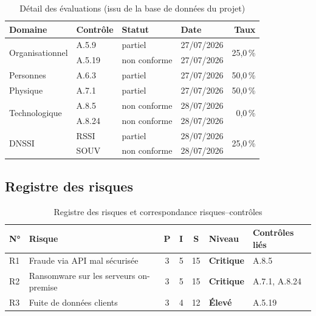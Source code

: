 \documentclass[11pt,a4paper]{article}
\newcommand{\lvl}[2]{\textcolor{#1}{\textbf{#2}}}
\begin{document}
\begin{table}[H]
\centering\small
\begin{tabular}{@{}llllr@{}}
\toprule
\textbf{Domaine} & \textbf{Contrôle} & \textbf{Statut} & \textbf{Date} & \textbf{Taux}\\
\midrule
\multirow{2}{*}{Organisationnel} & A.5.9 & partiel & 27/07/2026 & \multirow{2}{*}{25,0\,\%}\\
 & A.5.19 & non conforme & 27/07/2026 & \\
Personnes & A.6.3 & partiel & 27/07/2026 & 50,0\,\%\\
Physique & A.7.1 & partiel & 27/07/2026 & 50,0\,\%\\
\multirow{2}{*}{Technologique} & A.8.5 & non conforme & 28/07/2026 & \multirow{2}{*}{0,0\,\%}\\
 & A.8.24 & non conforme & 28/07/2026 & \\
\multirow{2}{*}{DNSSI} & RSSI & partiel & 28/07/2026 & \multirow{2}{*}{25,0\,\%}\\
 & SOUV & non conforme & 28/07/2026 & \\
\bottomrule
\end{tabular}
\caption{Détail des évaluations (issu de la base de données du projet)}
\end{table}

\subsection{Registre des risques}
\begin{table}[H]
\centering\small
\begin{tabularx}{\linewidth}{@{}lXcccll@{}}
\toprule
\textbf{N°} & \textbf{Risque} & \textbf{P} & \textbf{I} & \textbf{S} & \textbf{Niveau} & \textbf{Contrôles liés}\\
\midrule
R1 & Fraude via API mal sécurisée & 3 & 5 & 15 & \lvl{rcrit}{Critique} & A.8.5\\
R2 & Ransomware sur les serveurs on-premise & 3 & 5 & 15 & \lvl{rcrit}{Critique} & A.7.1, A.8.24\\
R3 & Fuite de données clients & 3 & 4 & 12 & \lvl{rhigh}{Élevé} & A.5.19\\
\bottomrule
\end{tabularx}
\caption{Registre des risques et correspondance risques--contrôles}
\end{table}
\end{document}
